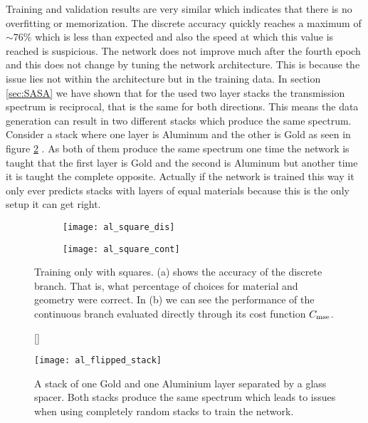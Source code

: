 \indent
Training and validation results are very similar which indicates that there is no overfitting or memorization. The discrete accuracy quickly reaches a maximum of $\sim 76\%$ which is less than expected and also the speed at which this value is reached is suspicious. The network does not improve much after the fourth epoch and this does not change by tuning the network architecture. This is because the issue lies not within the architecture but in the training data. In section \ref{sec:SASA} we have shown that for the used two layer stacks the transmission spectrum is reciprocal, that is the same for both directions. This means the data generation can result in two different stacks which produce the same spectrum. Consider a stack where one layer is Aluminum and the other is Gold as seen in figure \ref{fig:al:same_spec} . As both of them produce the same spectrum one time the network is taught that the first layer is Gold and the second is Aluminum but another time it is taught the complete opposite. Actually if the network is trained this way it only ever predicts stacks with layers of equal materials because this is the only setup it can get right.

\begin{figure}[H]
    \centering
    \captionsetup[subfigure]{position=b}
    \begin{subfigure}{.5\textwidth}
        \centering
        \texttt{[image: al\_square\_dis]}
        \caption{}
    \end{subfigure}%
    \begin{subfigure}{.5\textwidth}
        \centering
        \texttt{[image: al\_square\_cont]}
        \caption{}
    \end{subfigure}
    
    \caption{Training only with squares. (a) shows the accuracy of the discrete branch. That is, what percentage of choices for material and geometry were correct. In (b) we can see the performance of the continuous branch evaluated directly through its cost function $C_{\mathrm{mse}}$.}
    \label{fig:al:square_results}
    \end{figure}

\begin{figure}[H]
    [\FBwidth]
    {\caption{A stack of one Gold and one Aluminium layer separated by a glass spacer. Both stacks produce the same spectrum which leads to issues when using completely random stacks to train the network.}
    \label{fig:al:same_spec}}
    {\texttt{[image: al\_flipped\_stack]}}
\end{figure}


